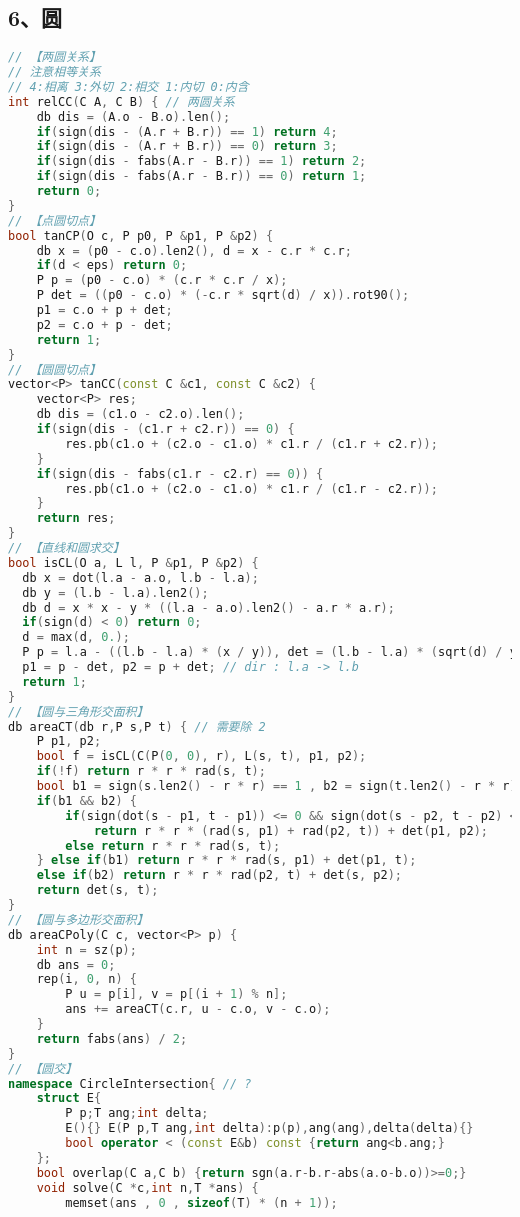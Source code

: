 \subsection{6、圆}
\begin{lstlisting}[language=C++]
// 【两圆关系】
// 注意相等关系
// 4:相离 3:外切 2:相交 1:内切 0:内含
int relCC(C A, C B) { // 两圆关系
	db dis = (A.o - B.o).len();
	if(sign(dis - (A.r + B.r)) == 1) return 4;
	if(sign(dis - (A.r + B.r)) == 0) return 3;
	if(sign(dis - fabs(A.r - B.r)) == 1) return 2;
	if(sign(dis - fabs(A.r - B.r)) == 0) return 1;
	return 0;
}
// 【点圆切点】
bool tanCP(O c, P p0, P &p1, P &p2) {
	db x = (p0 - c.o).len2(), d = x - c.r * c.r;
	if(d < eps) return 0;
	P p = (p0 - c.o) * (c.r * c.r / x);
	P det = ((p0 - c.o) * (-c.r * sqrt(d) / x)).rot90();
	p1 = c.o + p + det;
	p2 = c.o + p - det;
	return 1;
}
// 【圆圆切点】
vector<P> tanCC(const C &c1, const C &c2) {
	vector<P> res;
	db dis = (c1.o - c2.o).len();
	if(sign(dis - (c1.r + c2.r)) == 0) {
		res.pb(c1.o + (c2.o - c1.o) * c1.r / (c1.r + c2.r));
	}
	if(sign(dis - fabs(c1.r - c2.r) == 0)) {
		res.pb(c1.o + (c2.o - c1.o) * c1.r / (c1.r - c2.r));
	}
	return res;
}
// 【直线和圆求交】
bool isCL(O a, L l, P &p1, P &p2) {
  db x = dot(l.a - a.o, l.b - l.a);
  db y = (l.b - l.a).len2();
  db d = x * x - y * ((l.a - a.o).len2() - a.r * a.r);
  if(sign(d) < 0) return 0;
  d = max(d, 0.);
  P p = l.a - ((l.b - l.a) * (x / y)), det = (l.b - l.a) * (sqrt(d) / y);
  p1 = p - det, p2 = p + det; // dir : l.a -> l.b
  return 1;
}
// 【圆与三角形交面积】
db areaCT(db r,P s,P t) { // 需要除 2
	P p1, p2;
	bool f = isCL(C(P(0, 0), r), L(s, t), p1, p2);
	if(!f) return r * r * rad(s, t);
	bool b1 = sign(s.len2() - r * r) == 1 , b2 = sign(t.len2() - r * r) == 1;
	if(b1 && b2) {
		if(sign(dot(s - p1, t - p1)) <= 0 && sign(dot(s - p2, t - p2) <= 0))
			return r * r * (rad(s, p1) + rad(p2, t)) + det(p1, p2);
		else return r * r * rad(s, t);
	} else if(b1) return r * r * rad(s, p1) + det(p1, t);
	else if(b2) return r * r * rad(p2, t) + det(s, p2);
	return det(s, t);
}
// 【圆与多边形交面积】
db areaCPoly(C c, vector<P> p) { 
	int n = sz(p);
	db ans = 0;
	rep(i, 0, n) {
		P u = p[i], v = p[(i + 1) % n];
		ans += areaCT(c.r, u - c.o, v - c.o);
	}
	return fabs(ans) / 2;
}
// 【圆交】
namespace CircleIntersection{ // ?
	struct E{
		P p;T ang;int delta;
		E(){} E(P p,T ang,int delta):p(p),ang(ang),delta(delta){}
		bool operator < (const E&b) const {return ang<b.ang;}
	};
	bool overlap(C a,C b) {return sgn(a.r-b.r-abs(a.o-b.o))>=0;}
	void solve(C *c,int n,T *ans) {
		memset(ans , 0 , sizeof(T) * (n + 1));

\end{lstlisting}
